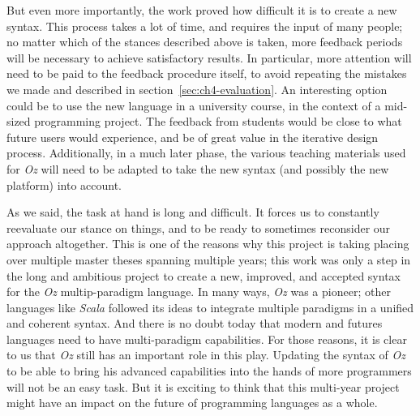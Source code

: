 But even more importantly, the work proved how difficult it is to create a new syntax.
This process takes a lot of time, and requires the input of many people;
no matter which of the stances described above is taken, more feedback periods will be necessary to achieve satisfactory results.
In particular, more attention will need to be paid to the feedback procedure itself, to avoid repeating the mistakes we made and described in section~\ref{sec:ch4-evaluation}.
An interesting option could be to use the new language in a university course, in the context of a mid-sized programming project.
The feedback from students would be close to what future users would experience, and be of great value in the iterative design process.\newline
Additionally, in a much later phase, the various teaching materials used for \textit{Oz} will need to be adapted to take the new syntax (and possibly the new platform) into account.\newline

As we said, the task at hand is long and difficult.
It forces us to constantly reevaluate our stance on things, and to be ready to sometimes reconsider our approach altogether.
This is one of the reasons why this project is taking placing over multiple master theses spanning multiple years;
this work was only a step in the long and ambitious project to create a new, improved, and accepted syntax for the \textit{Oz} multip-paradigm language.
In many ways, \textit{Oz} was a pioneer;
other languages like \textit{Scala} followed its ideas to integrate multiple paradigms in a unified and coherent syntax.
And there is no doubt today that modern and futures languages need to have multi-paradigm capabilities.
For those reasons, it is clear to us that \textit{Oz} still has an important role in this play.\newline
Updating the syntax of \textit{Oz} to be able to bring his advanced capabilities into the hands of more programmers will not be an easy task.
But it is exciting to think that this multi-year project might have an impact on the future of programming languages as a whole.